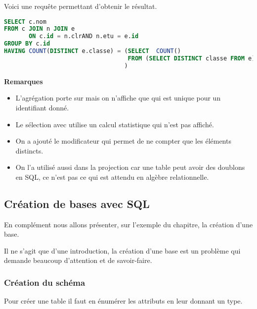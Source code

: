 Voici une requête permettant d'obtenir le résultat.
\begin{lstlisting}[language=SQL]
SELECT c.nom
FROM c JOIN n JOIN e 
       ON c.id = n.clrAND n.etu = e.id
GROUP BY c.id
HAVING COUNT(DISTINCT e.classe) = (SELECT  COUNT()
                                   FROM (SELECT DISTINCT classe FROM e)
                                  )
\end{lstlisting}
{\bf Remarques}
\begin{itemize}
    \item L'agrégation porte sur  mais on n'affiche que  qui est unique pour un identifiant donné.
    \item Le sélection avec  utilise un calcul statistique qui n'est pas affiché.
    \item On a ajouté le modificateur  qui permet de ne compter que les éléments distincts.
    \item On l'a utilisé aussi dans la projection  car une table peut avoir des doublons en SQL, ce n'est pas ce qui est attendu en algèbre relationnelle.
\end{itemize}
\newpage
\subsection{Création de bases avec SQL} 
En complément nous allons présenter, sur l'exemple du chapitre, la création d'une base.

Il ne s'agit que d'une introduction, la création d'une base est un problème qui demande beaucoup d'attention et de savoir-faire.
\subsubsection{Création du schéma}
Pour créer une table il faut en énumérer les attributs en leur donnant un type. 

